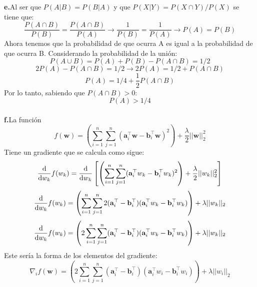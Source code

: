 \documentclass[14pt,a4paper]{report}
\begin{document}
\textbf{e.}\quad	 Al ser que $P(A|B)=P(B|A)$ y que $P(X|Y)=P(X\cap Y)/P(X)$ se tiene que:
\begin{equation*}
\frac{P(A\cap B)}{P(B)}=\frac{P(A\cap B)}{P(A)}
\rightarrow\frac{1}{P(B)}=\frac{1}{P(A)}\rightarrow P(A)=P(B)
\end{equation*}
Ahora tenemos que la probabilidad de que ocurra A es igual a la probabilidad de que ocurra B. Considerando la probabilidad de la unión:
\begin{equation}
P(A\cup B)=P(A)+P(B)-P(A\cap B)=1/2
\end{equation}
\begin{equation*}
2P(A)-P(A\cap B)=1/2 \rightarrow 2P(A)=1/2+P(A\cap B)
\end{equation*}
\begin{equation}
P(A)=1/4+\frac{1}{2}P(A\cap B)
\end{equation}
Por lo tanto, sabiendo que $P(A\cap B)>0$:
\begin{equation}
P(A)>1/4
\end{equation}
\\
\textbf{f.}\quad La función\\
\begin{equation}
	f(\mathbf{w})=\left(\sum_{i=1}^{n}\sum_{j=1}^{n}(\mathbf{a}_{i}^{\top}\mathbf{w}-\mathbf{b}_{i}^{\top}\mathbf{w})^2\right)+\frac{\lambda}{2}||\mathbf{w}||_{2}^{2}
\end{equation}
Tiene un gradiente que se calcula como sigue:
\begin{equation*}
	\dv{w_{k}}f(w_{k})=\dv{w_{k}}\left[\left(\sum_{i=1}^{n}\sum_{j=1}^{n}(\mathbf{a}_{i}^{\top}w_{k}-\mathbf{b}_{i}^{\top}w_{k})^2\right)+\frac{\lambda}{2}||w_{k}||_{2}^{2}\right]
\end{equation*}
\begin{equation*}
	\dv{w_{k}}f(w_{k})=\left(\sum_{i=1}^{n}\sum_{j=1}^{n}2(\mathbf{a}_{i}^{\top}-\mathbf{b}_{i}^{\top})(\mathbf{a}_{i}^{\top}w_{k}-\mathbf{b}_{i}^{\top}w_{k})\right)+\lambda||w_{k}||_{2}
\end{equation*}
\begin{equation*}
	\dv{w_{k}}f(w_{k})=\left(2\sum_{i=1}^{n}\sum_{j=1}^{n}(\mathbf{a}_{i}^{\top}-\mathbf{b}_{i}^{\top})(\mathbf{a}_{i}^{\top}w_{k}-\mathbf{b}_{i}^{\top}w_{k})\right)+\lambda||w_{k}||_{2}
\end{equation*}
Este sería la forma de los elementos del gradiente:
\begin{equation}
	\nabla_{i} f(\mathbf{w})=\left(2\sum_{i=1}^{n}\sum_{j=1}^{n}(\mathbf{a}_{i}^{\top}-\mathbf{b}_{i}^{\top})(\mathbf{a}_{i}^{\top}w_{i}-\mathbf{b}_{i}^{\top}w_{i})\right)+\lambda||w_{i}||_{2}
\end{equation}
\end{document}
